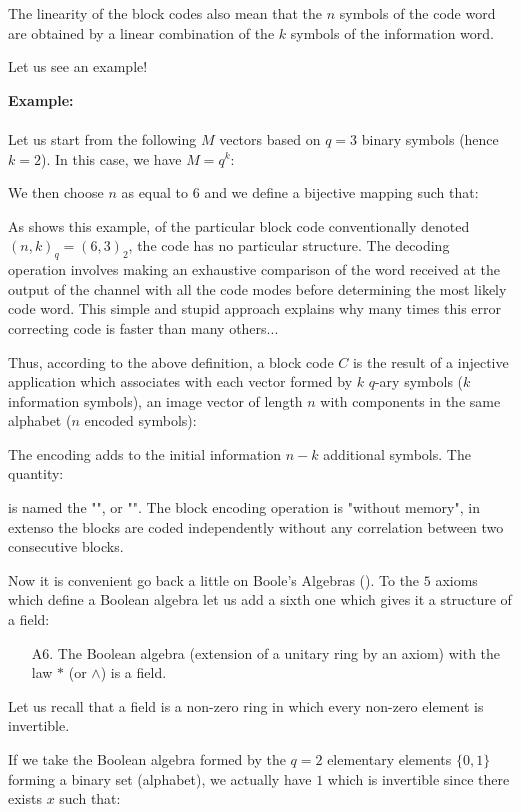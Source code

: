 	\begin{tcolorbox}[title=Remark,colframe=black,arc=10pt]
	The linearity of the block codes also mean that the $n$ symbols of the code word are obtained by a linear combination of the $k$ symbols of the information word.
	\end{tcolorbox}
	Let us see an example!
	\begin{tcolorbox}[colframe=black,colback=white,sharp corners]
	\textbf{{\Large {}}Example:}\\\\
	Let us start from the following $M$ vectors based on $q = 3$ binary symbols (hence $k = 2$). In this case, we have $M=q^k$:
	
	We then choose $n$ as equal to $6$ and we define a bijective mapping such that:
	
	As shows this example, of the particular block code conventionally denoted $(n, k)_q = (6, 3)_2$, the code has no particular structure. The decoding operation involves making an exhaustive comparison of the word received at the output of the channel with all the code modes before determining the most likely code word. This simple and stupid approach explains why many times this error correcting code is faster than many others...
	\end{tcolorbox}
	Thus, according to the above definition, a block code $C$ is the result of a injective application which associates with each vector formed by $k$ $q$-ary symbols ($k$ information symbols), an image vector of length $n$ with components in the same alphabet ($n$ encoded symbols):
	
	 The encoding adds to the initial information $n-k$ additional symbols. The quantity:
	
	is named the "", or "". The block encoding operation is "without memory", in extenso the blocks are coded independently without any correlation between two consecutive blocks.
	
	Now it is convenient go back a little on Boole's Algebras (). To the $5$ axioms which define a Boolean algebra let us add a sixth one which gives it a structure of a field:
	\begin{enumerate}
		\item[A6.] The Boolean algebra (extension of a unitary ring by an axiom) with the law $*$ (or $\wedge$) is a field.
	\end{enumerate}
	\begin{tcolorbox}[title=Remark,colframe=black,arc=10pt]
	Let us recall that a field is a non-zero ring in which every non-zero element is invertible.
	\end{tcolorbox}
	If we take the Boolean algebra formed by the $q=2$ elementary elements $\{0,1\}$ forming a binary set (alphabet), we actually have $1$ which is invertible since there exists $x$ such that:
	
